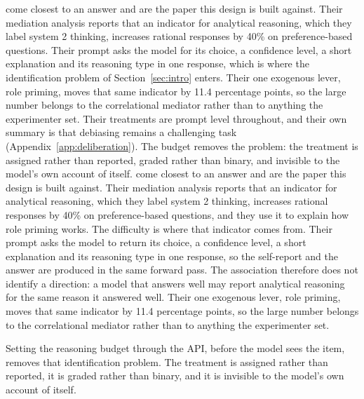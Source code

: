 \ifsubmission
\citet{bini2026behavioral} come closest to an answer and are the paper this
design is built against. Their mediation analysis reports that an indicator
for analytical reasoning, which they label system 2 thinking, increases
rational responses by 40\% on preference-based questions. Their prompt asks
the model for its choice, a confidence level, a short explanation and its
reasoning type in one response, which is where the identification problem of
Section~\ref{sec:intro} enters. Their one exogenous lever, role priming,
moves that same indicator by 11.4 percentage points, so the large number
belongs to the correlational mediator rather than to anything the
experimenter set. Their treatments are prompt level throughout, and their own
summary is that debiasing remains a challenging task
(Appendix~\ref{app:deliberation}). The budget removes the problem: the
treatment is assigned rather than reported, graded rather than binary, and
invisible to the model's own account of itself.
\else
\citet{bini2026behavioral} come closest to an answer and are the paper this
design is built against. Their mediation analysis reports that an indicator
for analytical reasoning, which they label system 2 thinking, increases
rational responses by 40\% on preference-based questions, and they use it to
explain how role priming works. The difficulty is where that indicator comes
from. Their prompt asks the model to return its choice, a confidence level, a
short explanation and its reasoning type in one response, so the self-report
and the answer are produced in the same forward pass. The association
therefore does not identify a direction: a model that answers well may
report analytical reasoning for the same reason it answered well. Their one
exogenous lever, role priming, moves that same indicator by 11.4
percentage points, so the large number belongs to the correlational mediator
rather than to anything the experimenter set.


Setting the reasoning budget through the API, before the model sees the item,
removes that identification problem. The treatment is assigned rather than
reported, it is graded rather than binary, and it is invisible to the model's
own account of itself.
\fi

